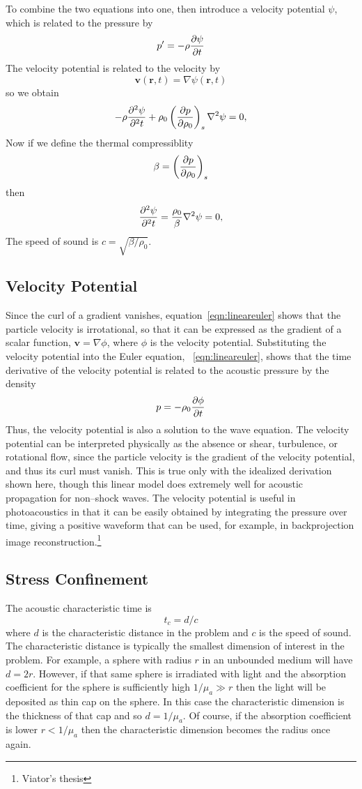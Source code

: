 ﻿\documentclass{article}
\begin{document}
To combine the two equations into one, then introduce a velocity potential $\psi$, which
is related to the pressure by
$$
p' = -\rho {\partial \psi\over\partial t}
$$
The velocity potential is related to the velocity by
$$
\mathbf{v}(\mathbf{r},t)=\nabla \psi(\mathbf{r},t)
$$
so we obtain
$$
-\rho {\partial^2 \psi\over\partial^2 t} + \rho_0\left({\partial p\over \partial \rho_0}\right)_s\nabla^2 \psi = 0,
$$
Now if we define the thermal compressiblity
$$
\beta = \left({\partial p\over \partial \rho_0}\right)_s
$$
then
$$
{\partial^2 \psi\over\partial^2 t} = {\rho_0\over \beta} \nabla^2 \psi = 0,
$$
The speed of sound is $c=\sqrt{\beta/\rho_0}$.

\subsection{Velocity Potential}

Since the curl of a gradient vanishes, equation~\ref{eqn:lineareuler}
shows that the particle velocity is irrotational, so that it can be
expressed as the gradient of a scalar function, $\mathbf{v}=\nabla \phi$,
where $\phi$ is the velocity potential.  Substituting the velocity
potential into the Euler equation, ~\ref{eqn:lineareuler}, shows that
the time derivative of the velocity potential is related to the acoustic
pressure by the density
$$
p=-\rho_0 {\partial \phi\over \partial t}
$$
Thus, the velocity potential is also a solution to the wave equation. 
The velocity potential can be interpreted physically as the absence or
shear, turbulence, or rotational flow, since the particle velocity is
the gradient of the velocity potential, and thus its curl must vanish. 
This is true only with the idealized derivation shown here, though this
linear model does extremely well for acoustic propagation for non--shock
waves.  The velocity potential is useful in photoacoustics
in that it can be easily obtained by integrating the pressure over time,
giving a positive waveform that can be used, for example, in
backprojection image reconstruction.\footnote{Viator's thesis}

\subsection{Stress Confinement}
The acoustic characteristic time is
$$
t_c = d/c
$$
where $d$ is the characteristic distance in the problem and $c$ is the speed of sound.
The characteristic distance is typically the smallest dimension of interest
in the problem.  For example, a sphere with radius $r$ in an unbounded medium
will have $d=2r$.  However, if that same sphere is irradiated with light and the
absorption coefficient for the sphere is sufficiently high $1/\mu_a\gg r$ then
the light will be deposited as thin cap on the sphere.  In this case the characteristic
dimension is the thickness of that cap and so $d = 1/\mu_a$.  Of course, if the 
absorption coefficient is lower $r < 1/\mu_a$ then the characteristic dimension 
becomes the radius once again.  
\end{document}
